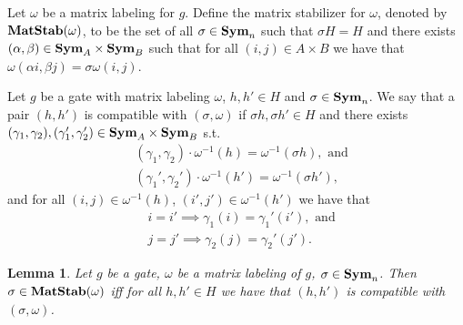 \documentclass[12pt]{report}
\newtheorem{lem}[thm]{Lemma} \newtheorem{prop}[thm]{Proposition}
\newcommand{\matstab}{\text{\textbf{MatStab}}}
\newcommand{\sym}{\text{\textbf{Sym}}}
\begin{document}

\begin{definition}
  Let $\omega$ be a matrix labeling for $g$. Define the matrix stabilizer for
  $\omega$, denoted by $\matstab(\omega)$, to be the set of all $\sigma \in
  \sym_n$ such that $\sigma H = H$ and there exists $(\alpha, \beta) \in \sym_A
  \times \sym_B$ such that for all $(i,j) \in A \times B$ we have that $\omega
  (\alpha i, \beta j) = \sigma \omega (i,j)$.
\end{definition}


\begin{definition}
  Let $g$ be a gate with matrix labeling $\omega$, $h,h' \in H$ and $\sigma \in
  \sym_n$. We say that a pair $(h, h')$ is compatible with $(\sigma, \omega)$ if
  $\sigma h, \sigma h' \in H$ and there exists $(\gamma_1, \gamma_2),
  (\gamma_1', \gamma_2') \in \sym_A \times \sym_B$ s.t.
  \begin{align*}
    &(\gamma_1, \gamma_2) \cdot \omega^{-1} (h) = \omega^{-1}(\sigma h), \text{ and} \\ 
    &(\gamma_1', \gamma_2') \cdot \omega^{-1} (h') = \omega^{-1}(\sigma h'),
  \end{align*}
  and for all $(i,j) \in \omega^{-1}(h)$, $(i',j') \in \omega^{-1}(h')$ we have
  that
  \begin{align*}
    &i =i' \implies \gamma_1(i) = \gamma_1'(i'), \text{ and} \\
    &j =j' \implies \gamma_2(j) = \gamma_2'(j').
  \end{align*}

\end{definition}

\begin{lem}
  Let $g$ be a gate, $\omega$ be a matrix labeling of $g$, $\sigma \in \sym_n$.
  Then $\sigma \in \matstab(\omega)$ iff for all $h,h' \in H$ we have that
  $(h,h')$ is compatible with $(\sigma, \omega)$.
\end{lem}
\end{document}
